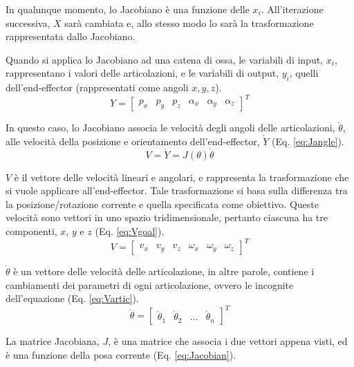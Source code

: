 In qualunque momento, lo Jacobiano è una funzione delle $x_i$. All'iterazione successiva, $X$ sarà cambiata e, allo stesso modo lo sarà la trasformazione rappresentata dallo Jacobiano.

Quando si applica lo Jacobiano ad una catena di ossa, le variabili di input, $x_i$, rappresentano i valori delle articolazioni, e le variabili di output, $y_i$, quelli dell'end-effector (rappresentati come angoli $x,y,z$).
\begin{equation}
    Y=
    \begin{bmatrix}
        p_x & p_y & p_z & \alpha_x & \alpha_y & \alpha_z
    \end{bmatrix}
    ^T    
\end{equation}

In questo caso, lo Jacobiano associa le velocità degli angoli delle articolazioni, $\dot{\theta}$, alle velocità della posizione e orientamento dell'end-effector, $\dot{Y}$ (Eq. \ref{eq:Jangle}).
\begin{equation}\label{eq:Jangle}
    V = \dot{Y} = J(\theta)\dot{\theta}
\end{equation}

$V$ è il vettore delle velocità lineari e angolari, e rappresenta la trasformazione che si vuole applicare all'end-effector.
Tale trasformazione si basa sulla differenza tra la posizione/rotazione corrente e quella specificata come obiettivo.
Queste velocità sono vettori in uno spazio tridimensionale, pertanto ciascuna ha tre componenti, $x$, $y$ e $z$ (Eq. \ref{eq:Vgoal}).
\begin{equation}\label{eq:Vgoal}
    V=
    \begin{bmatrix}
        v_x & v_y & v_z & \omega_x & \omega_y & \omega_z
    \end{bmatrix}
    ^T
\end{equation}

$\dot{\theta}$ è un vettore delle velocità delle articolazione, in altre parole, contiene i cambiamenti dei parametri di ogni articolazione, ovvero le incognite dell'equazione (Eq. \ref{eq:Vartic}).
\begin{equation}\label{eq:Vartic}
    \dot{\theta}=
    \begin{bmatrix}
        \dot{\theta}_1 & \dot{\theta}_2 & \ldots & \dot{\theta}_n
    \end{bmatrix}
    ^T
\end{equation}

La matrice Jacobiana, $J$, è una matrice che associa i due vettori appena visti, ed è una funzione della posa corrente (Eq. \ref{eq:Jacobian}).

